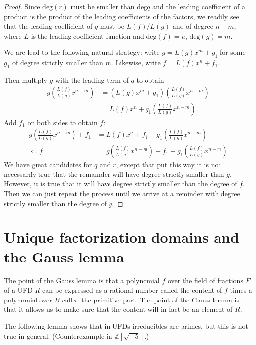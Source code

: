 \begin{proof}
Since $\text{deg}(r)$ must be smaller than $\text{deg}q$
and the leading coefficient of a product is the
product of the leading coefficients of the factors,
we readily see that the leading coefficient of $q$ must
be $L(f)/L(g)$ and of degree $n-m$, where $L$ is the leading
coefficient function and $\text{deg}(f)=n$, $\text{deg}(g)=m$.

We are lead to the following natural strategy:
write $g=L(g)x^m+g_1$ for some $g_1$ of degree
strictly smaller than $m$. Likewise, write
$f=L(f)x^n+f_1$.

Then multiply $g$ with the leading term of $q$ to obtain
\begin{align*}
g \left(\frac{L(f)}{L(g)}x^{n-m}\right)&=(L(g)x^m+g_1)
\left(\frac{L(f)}{L(g)}x^{n-m}\right)\\
&=L(f)x^n+g_1\left(\frac{L(f)}{L(g)}x^{n-m}\right).
\end{align*}
Add $f_1$ on both sides to obtain $f$:
\begin{align*}
g\left(\frac{L(f)}{L(g)}x^{n-m}\right)+f_1&=L(f)x^n+f_1+
g_1\left(\frac{L(f)}{L(g)}x^{n-m}\right)\\
\iff f&=g\left(\frac{L(f)}{L(g)}x^{n-m}\right)+f_1
-g_1\left(\frac{L(f)}{L(g)}x^{n-m}\right)
\end{align*}
We have great candidates for $q$ and $r$, except that put this way
it is not necessarily true that the remainder will have degree
strictly smaller than $g$. However, it is true that it
will have degree strictly smaller than the degree of $f$. 
Then we can just repeat
the process until we arrive at a reminder with degree
strictly smaller than the degree of $g$.
\end{proof}

\section{Unique factorization domains and the Gauss lemma}
\label{section-UFD}

The point of the Gauss lemma is that a polynomial $f$ over the field of fractions
$F$ of a UFD $R$ can be expressed as a rational number called the content of $f$
times a polynomial over $R$ called the primitive part. The point of the Gauss
lemma is that it allows us to make sure that the content will in fact be an
element of $R$.

\medskip\noindent
The following lemma shows that in UFDs irreducibles are primes, but this is not
true in general. (Counterexample in $\mathbb{Z}[\sqrt{-5}]$.)


